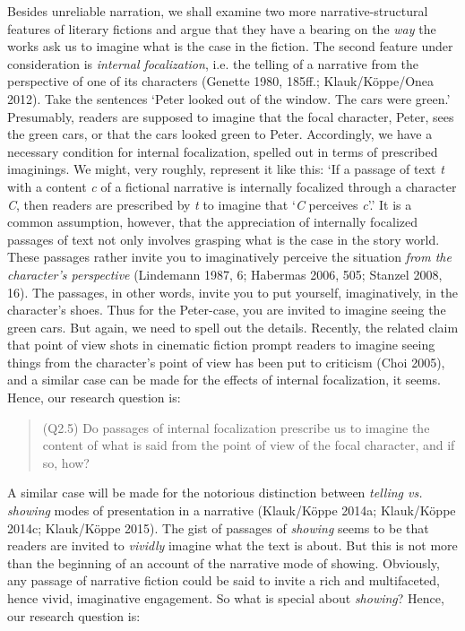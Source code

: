 \noindent Besides unreliable narration, we shall examine two more narrative-structural features of literary fictions and argue that they have a bearing on the \emph{way} the works ask us to imagine what is the case in the fiction. The second feature under consideration is \emph{internal focalization}, i.e. the telling of a narrative from the perspective of one of its characters (Genette 1980, 185ff.; Klauk/K\"oppe/Onea 2012). Take the sentences `Peter looked out of the window. The cars were green.' Presumably, readers are supposed to imagine that the focal character, Peter, sees the green cars, or that the cars looked green to Peter. Accordingly, we have a necessary condition for internal focalization, spelled out in terms of prescribed imaginings. We might, very roughly, represent it like this: `If a passage of text \emph{t} with a content \emph{c} of a fictional narrative is internally focalized through a character \emph{C}, then readers are prescribed by \emph{t} to imagine that `\emph{C} perceives \emph{c}'.' It is a common assumption, however, that the appreciation of internally focalized passages of text not only involves grasping what is the case in the story world. These passages rather invite you to imaginatively perceive the situation \emph{from the character's perspective} (Lindemann 1987, 6; Habermas 2006, 505; Stanzel 2008, 16). The passages, in other words, invite you to put yourself, imaginatively, in the character's shoes. Thus for the Peter-case, you are invited to
imagine seeing the green cars. But again, we need to spell out the details. Recently, the related claim that point of view shots in cinematic fiction prompt readers to imagine seeing things from the character's point of view has been put to criticism (Choi 2005), and a similar case can be made for the effects of internal focalization, it seems. Hence, our research question is:

\vspace{-.2cm}
\begin{quote}
(Q2.5) Do passages of internal focalization prescribe us to imagine the content of what is said from  the point of view of the focal character, and if so, how? 
\end{quote}
\vspace{-.2cm}

\noindent A similar case will be made for the notorious distinction between \emph{telling vs. showing} modes of presentation in a narrative (Klauk/K\"oppe 2014a; Klauk/K\"oppe 2014c; Klauk/K\"oppe 2015). The gist of passages of \emph{showing} seems to be that readers are invited to \emph{vividly} imagine what the text is about. But this is not more than the beginning of an account of the narrative mode of showing. Obviously, any passage of narrative fiction could be said to invite a rich and multifaceted, hence vivid, imaginative engagement. So what is special about \emph{showing}? Hence, our research question is:

